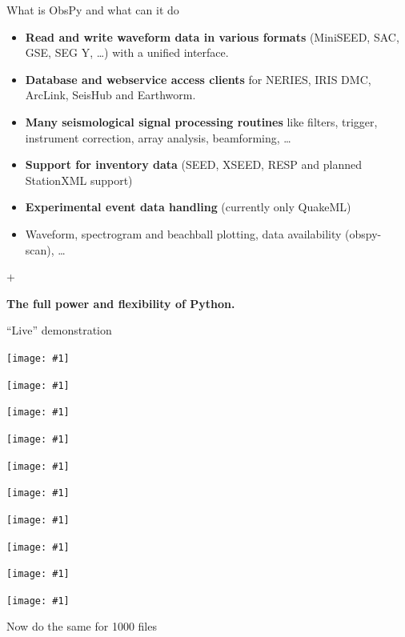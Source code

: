 \documentclass[handout]{beamer}
\newcommand{\maxFrameImage}[1]{
\begin{frame}[plain]
\begin{changemargin}{-1cm}{-1cm}
\begin{center}
\texttt{[image: \#1]}
\end{center}
\end{changemargin}
\end{frame}
}
\newenvironment{changemargin}[2]{%
\begin{list}{}{%
\setlength{\topsep}{0pt}%
\setlength{\leftmargin}{#1}%
\setlength{\rightmargin}{#2}%
\setlength{\listparindent}{\parindent}%
\setlength{\itemindent}{\parindent}%
\setlength{\parsep}{\parskip}%
}%
\item[]}{\end{list}}
\begin{document}
\begin{frame}{What is ObsPy and what can it do}
    \begin{itemize}
        \item \textbf{Read and write waveform data in various formats} (MiniSEED, SAC, GSE, SEG Y, \dots) with a unified interface.
        \item \textbf{Database and webservice access clients} for NERIES, IRIS DMC, ArcLink, SeisHub and Earthworm.
        \item \textbf{Many seismological signal processing routines} like filters, trigger, instrument correction, array analysis, beamforming, \dots
        \item \textbf{Support for inventory data} (SEED, XSEED, RESP and planned StationXML support)
        \item \textbf{Experimental event data handling} (currently only QuakeML)
        \item Waveform, spectrogram and beachball plotting, data availability (obspy-scan), \dots
    \end{itemize}
    \begin{center}
        +
    \end{center}

    \begin{center}
        \textbf{The full power and flexibility of Python.}
    \end{center}
    
\end{frame}

\begin{frame}{}
    \LARGE
    \begin{center}
        ``Live'' demonstration
    \end{center}

\end{frame}

\maxFrameImage{./images/reading_1.png}
\maxFrameImage{./images/reading_2.png}
\maxFrameImage{./images/reading_3.png}
\maxFrameImage{./images/reading_4.png}
\maxFrameImage{./images/reading_5.png}
\maxFrameImage{./images/reading_6.png}
\maxFrameImage{./images/reading_7.png}
\maxFrameImage{./images/reading_8.png}
\maxFrameImage{./images/reading_9.png}
\maxFrameImage{./images/reading_10.png}


\begin{frame}[plain]{}
    \LARGE
    \begin{center}
        Now do the same for 1000 files
    \end{center}

\end{frame}
\end{document}
